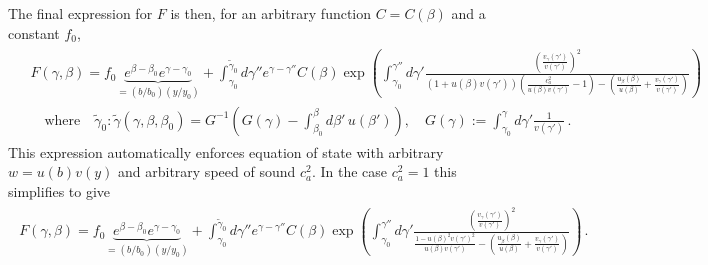 The final expression for $F$ is then, for an arbitrary function $C=C(\beta)$ and a constant $f_0$,
{\small\begin{align}
\begin{aligned}
    &F(\gamma,\beta)= f_0 \underbrace{e^{\beta-\beta_0} e^{\gamma-\gamma_0}}_{=(b/b_0)(y/y_0)}
    + \int^{\tilde{\gamma}_0}_{\gamma_0}\!\! \!\!\!d\gamma'' e^{\gamma-\gamma''} C(\beta) 
    \exp\!\left(\!\int^{\gamma''}_{\gamma_0} \!\!\!\!\!\!\!d\gamma' \tfrac{\left(\tfrac{v_\gamma(\gamma')}{v(\gamma')}\right)^2}{(1\!+\!u(\beta)v(\gamma'))\left(\frac{c_a^2}{u(\beta)v(\gamma')}-1\right)-\left(\tfrac{u_\beta(\beta)}{u(\beta)}+\tfrac{v_\gamma(\gamma')}{v(\gamma')}\right)}\!\right)\,\\[3pt]
    &\quad\text{where}\quad\tilde{\gamma}_0:\tilde{\gamma}(\gamma,\beta,\beta_0)=G^{-1}\left(G(\gamma)-\int^\beta_{\beta_0}d\beta'\, u(\beta')\right), \quad G(\gamma):=\int^\gamma_{\gamma_0} d\gamma'\frac{1}{v(\gamma')}\,.
\end{aligned}\end{align}}
This expression automatically enforces equation of state with arbitrary $w=u(b)v(y)$ and arbitrary speed of sound $c_a^2$.
In the case $c_a^2=1$ this simplifies to give
{\small\begin{align}
\begin{aligned}
    F(\gamma,\beta)= f_0 \underbrace{e^{\beta-\beta_0} e^{\gamma-\gamma_0}}_{=(b/b_0)(y/y_0)}
    + \int^{\tilde{\gamma}_0}_{\gamma_0}\!\! \!\!\!d\gamma'' e^{\gamma-\gamma''} C(\beta) 
    \exp\!\left(\!\int^{\gamma''}_{\gamma_0} \!\!\!\!\!\!\!d\gamma' \tfrac{\left(\tfrac{v_\gamma(\gamma')}{v(\gamma')}\right)^2}{\tfrac{1-u(\beta)^2v(\gamma')^2}{u(\beta)v(\gamma')}-\left(\tfrac{u_\beta(\beta)}{u(\beta)}+\tfrac{v_\gamma(\gamma')}{v(\gamma')}\right)}\!\right)\,.
\end{aligned}\end{align}}





